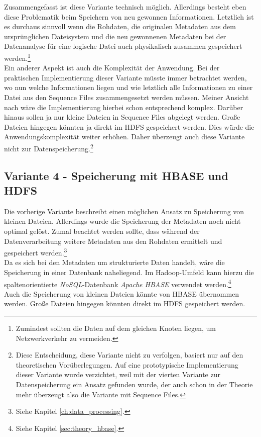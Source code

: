\noindent
Zusammengefasst ist diese Variante technisch möglich. Allerdings besteht eben diese Problematik beim Speichern von neu gewonnen Informationen. Letztlich ist es durchaus sinnvoll wenn die Rohdaten, die originalen Metadaten aus dem ursprünglichen Dateisystem und die neu gewonnenen Metadaten bei der Datenanalyse für eine logische Datei auch physikalisch zusammen gespeichert werden.\footnote{Zumindest sollten die Daten auf dem gleichen Knoten liegen, um Netzwerkverkehr zu vermeiden.}\\ 
Ein anderer Aspekt ist auch die Komplexität der Anwendung. Bei der praktischen Implementierung dieser Variante müsste immer betrachtet werden, wo nun welche Informationen liegen und wie letztlich alle Informationen zu einer Datei aus den Sequence Files zusammengesetzt werden müssen. Meiner Ansicht nach wäre die Implementierung hierbei schon entsprechend komplex. Darüber hinaus sollen ja nur kleine Dateien in Sequence Files abgelegt werden. Große Dateien hingegen könnten ja direkt im HDFS gespeichert werden. Dies würde die Anwendungskomplexität weiter erhöhen. Daher überzeugt auch diese Variante nicht zur Datenspeicherung.\footnote{Diese Entscheidung, diese Variante nicht zu verfolgen, basiert nur auf den theoretischen Vorüberlegungen. Auf eine prototypische Implementierung dieser Variante wurde verzichtet, weil mit der vierten Variante zur Datenspeicherung ein Ansatz gefunden wurde, der auch schon in der Theorie mehr überzeugt also die Variante mit Sequence Files.}

\subsection{Variante 4 - Speicherung mit HBASE und HDFS}
Die vorherige Variante beschreibt einen möglichen Ansatz zu Speicherung von kleinen Dateien. Allerdings wurde die Speicherung der Metadaten noch nicht optimal gelöst. Zumal beachtet werden sollte, dass während der Datenverarbeitung weitere Metadaten aus den Rohdaten ermittelt und gespeichert werden.\footnote{Siehe Kapitel \ref{ch:data_processing}.}\\
Da es sich bei den Metadaten um strukturierte Daten handelt, wäre die Speicherung in einer Datenbank naheliegend. Im Hadoop-Umfeld kann hierzu die spaltenorientierte \textit{NoSQL}-Datenbank \textit{Apache HBASE} verwendet werden.\footnote{Siehe Kapitel \ref{sec:theory_hbase}.}\\
Auch die Speicherung von kleinen Dateien könnte von HBASE übernommen werden. Große Dateien hingegen könnten direkt im HDFS gespeichert werden. 

